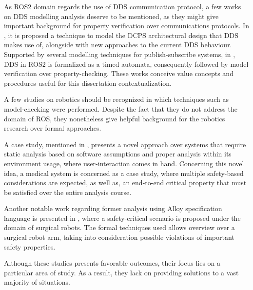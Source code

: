 As ROS2 domain regards the use of DDS communication protocol, a few works on DDS modelling analysis deserve to be mentioned, as they might give important background for property verification over communications protocols. In , it is proposed a technique to model the DCPS architectural design that DDS makes use of, alongside with new approaches to the current DDS behaviour. Supported by several modelling techniques for publish-subscribe systems, in , DDS in ROS2 is formalized as a timed automata, consequently followed by model verification over property-checking. These works conceive value concepts and procedures useful for this dissertation contextualization.

A few studies on robotics should be recognized in which techniques such as model-checking were performed. Despite the fact that they do not address the domain of ROS, they nonetheless give helpful background for the robotics research over formal approaches. 

A case study, mentioned in , presents a novel approach over systems that require static analysis based on software assumptions and proper analysis within its environment usage, where user-interaction comes in hand. Concerning this novel idea, a medical system is concerned as a case study, where multiple safety-based considerations are expected, as well as, an end-to-end critical property that must be satisfied over the entire analysis course. 

Another notable work regarding former analysis using Alloy specification language is presented in , where a safety-critical scenario is proposed under the domain of surgical robots. The formal techniques used allows overview over a surgical robot arm, taking into consideration possible violations of important safety properties. 

Although these studies presents favorable outcomes, their focus lies on a particular area of study. As a result, they lack on providing solutions to a vast majority of situations.